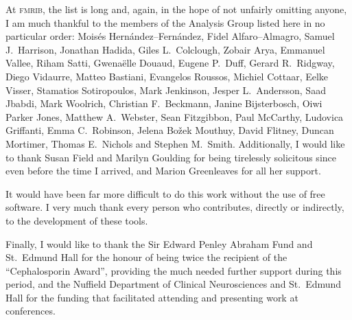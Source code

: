 \vspace{3mm}\noindent
At \textsc{fmrib}, the list is long and, again, in the hope of not unfairly omitting anyone, I am much thankful to the members of the Analysis Group listed here in no particular order: Mois{\'e}s Hern{\'a}ndez--Fern{\'a}ndez, Fidel Alfaro--Almagro, Samuel J.\ Harrison, Jonathan Hadida, Giles L.\ Colclough, Zobair Arya, Emmanuel Vallee, Riham Satti, Gwena\"{e}lle Douaud, Eugene P.\ Duff, Gerard R.\ Ridgway, Diego Vidaurre, Matteo Bastiani, Evangelos Roussos, Michiel Cottaar, Eelke Visser, Stamatios Sotiropoulos, Mark Jenkinson, Jesper L.\ Andersson, Saad Jbabdi, Mark Woolrich, Christian F.\ Beckmann, Janine Bijsterbosch, Oiwi Parker Jones, Matthew A.\ Webster, Sean Fitzgibbon, Paul McCarthy, Ludovica Griffanti, Emma C.\ Robinson, Jelena Bo\v{z}ek Mouthuy, David Flitney, Duncan Mortimer, Thomas E.\ Nichols and Stephen M.\ Smith. Additionally, I would like to thank Susan Field and Marilyn Goulding for being tirelessly solicitous since even before the time I arrived, and Marion Greenleaves for all her support.

\vspace{3mm}\noindent
It would have been far more difficult to do this work without the use of free software. I very much thank every person who contributes, directly or indirectly, to the development of these tools.

\vspace{3mm}\noindent
Finally, I would like to thank the Sir Edward Penley Abraham Fund and St.\ Edmund Hall for the honour of being twice the recipient of the ``Cephalosporin Award'', providing the much needed further support during this period, and the Nuffield Department of Clinical Neurosciences and St.\ Edmund Hall for the funding that facilitated attending and presenting work at conferences.
